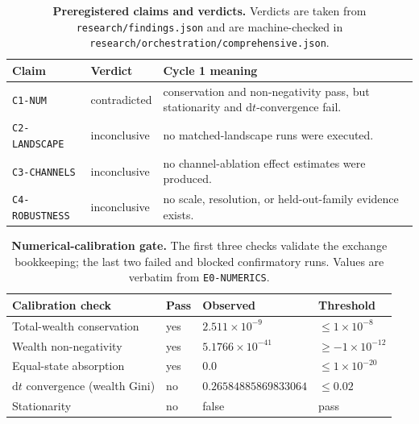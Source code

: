 \documentclass[11pt]{article}
\newcommand{\code}[1]{\texttt{#1}}
\begin{document}
\begin{table}[t]
\centering
\small
\begin{tabular}{@{}llp{7.0cm}@{}}
\toprule
\textbf{Claim} & \textbf{Verdict} & \textbf{Cycle 1 meaning} \\
\midrule
\code{C1-NUM} & contradicted & conservation and non-negativity pass, but stationarity and $\mathrm{d}t$-convergence fail. \\
\code{C2-LANDSCAPE} & inconclusive & no matched-landscape runs were executed. \\
\code{C3-CHANNELS} & inconclusive & no channel-ablation effect estimates were produced. \\
\code{C4-ROBUSTNESS} & inconclusive & no scale, resolution, or held-out-family evidence exists. \\
\bottomrule
\end{tabular}
\caption{\textbf{Preregistered claims and verdicts.} Verdicts are taken from
\code{research/findings.json} and are machine-checked in
\code{research/orchestration/comprehensive.json}.}
\label{tab:claims}
\end{table}

\begin{table}[t]
\centering
\small
\begin{tabular}{@{}llll@{}}
\toprule
\textbf{Calibration check} & \textbf{Pass} & \textbf{Observed} & \textbf{Threshold} \\
\midrule
Total-wealth conservation & yes & $2.511\times10^{-9}$ & $\le1\times10^{-8}$ \\
Wealth non-negativity & yes & $5.1766\times10^{-41}$ & $\ge-1\times10^{-12}$ \\
Equal-state absorption & yes & $0.0$ & $\le1\times10^{-20}$ \\
$\mathrm{d}t$ convergence (wealth Gini) & no & $0.26584885869833064$ & $\le0.02$ \\
Stationarity & no & false & pass \\
\bottomrule
\end{tabular}
\caption{\textbf{Numerical-calibration gate.} The first three checks validate
the exchange bookkeeping; the last two failed and blocked confirmatory runs.
Values are verbatim from \code{E0-NUMERICS}.}
\label{tab:calibration}
\end{table}
\end{document}
